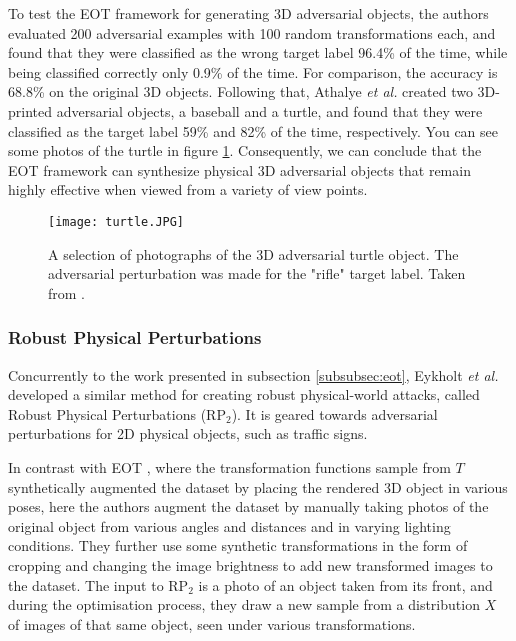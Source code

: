 \documentclass[11pt, a4paper, oneside]{article}
\begin{document}
To test the EOT framework for generating 3D adversarial objects, the authors evaluated 200 adversarial examples with 100 random transformations each, and found that they were classified as the wrong target label 96.4\% of the time, while being classified correctly only 0.9\% of the time. For comparison, the accuracy is 68.8\% on the original 3D objects. Following that, Athalye \textit{et al.} created two 3D-printed adversarial objects, a baseball and a turtle, and found that they were classified as the target label 59\% and 82\% of the time, respectively. You can see some photos of the turtle in figure \ref{fig:3d_turtle}. Consequently, we can conclude that the EOT framework can synthesize physical 3D adversarial objects that remain highly effective when viewed from a variety of view points.

\begin{figure}[h]
    \centering
    \texttt{[image: turtle.JPG]}
    \caption{A selection of photographs of the 3D adversarial turtle object. The adversarial perturbation was made for the "rifle" target label. Taken from \cite{athalye}.}
    \label{fig:3d_turtle}
\end{figure}

\subsubsection{Robust Physical Perturbations}

Concurrently to the work presented in subsection \ref{subsubsec:eot}, Eykholt \textit{et al.} \cite{evtimov_road_signs} developed a similar method for creating robust physical-world attacks, called Robust Physical Perturbations ($\textrm{RP}_2$). It is geared towards adversarial perturbations for 2D physical objects, such as traffic signs. 

In contrast with EOT \cite{athalye}, where the transformation functions sample from $T$ synthetically augmented the dataset by placing the rendered 3D object in various poses, here the authors augment the dataset by manually taking photos of the original object from various angles and distances and in varying lighting conditions. They further use some synthetic transformations in the form of cropping and changing the image brightness to add new transformed images to the dataset. The input to $\textrm{RP}_2$ is a photo of an object taken from its front, and during the optimisation process, they draw a new sample from a distribution $X$ of images of that same object, seen under various transformations.
\end{document}
